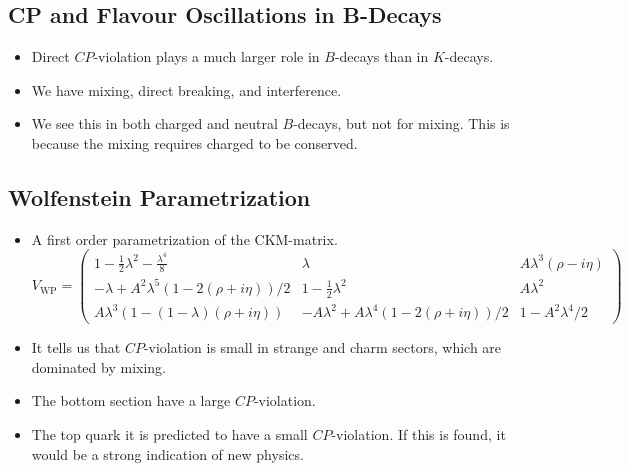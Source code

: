 \subsection{CP and Flavour Oscillations in B-Decays}
\begin{itemize}
    \item Direct $CP$-violation plays a much larger role in $B$-decays than in $K$-decays.
    \item We have mixing, direct breaking, and interference. 
    \item We see this in both charged and neutral $B$-decays, but not for mixing. This is because the mixing requires charged to be conserved. 
\end{itemize}

\subsection{Wolfenstein Parametrization}
\begin{itemize}
    \item A first order parametrization of the CKM-matrix.
    \begin{equation}
        V_{\text{WP}} = \begin{pmatrix}
            1 - \frac{1}{2}λ^2 - \frac{λ^{4}}{8} & λ & Aλ^3(\rho - iη) \\
            -λ + A^2λ^{5} \left(1 - 2 (ρ + iη)\right) / 2 & 1 - \frac{1}{2}λ^2 & Aλ^2 \\
            Aλ^3(1 - (1 - λ)(ρ + iη)) & -Aλ^2 + Aλ^{4}(1 - 2(ρ + i η)) / 2 & 1 - A^2λ^4 / 2
        \end{pmatrix}
    \end{equation}
    \item It tells us that $CP$-violation is small in strange and charm sectors, which are dominated by mixing. 
    \item The bottom section have a large $CP$-violation. 
    \item The top quark it is predicted to have a small $CP$-violation. If this is found, it would be a strong indication of new physics.
\end{itemize}
